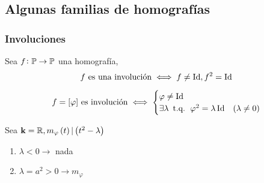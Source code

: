 \subsection{Algunas familias de homografías}

\subsubsection{Involuciones}

\begin{defi}
	Sea $f \colon \mathbb{P} \to \mathbb{P}$ una homografía,
	\[ f\text{ es una involución} \iff f \neq \operatorname{Id}, f^2 = \operatorname{Id} \]
\end{defi}
\begin{obs}
	\[
		f = [\varphi]\text{ es involución} \iff
		\begin{cases}
			\varphi \neq \operatorname{Id}  \\
			\exists\lambda\operatorname{\text{ t.q. }}\varphi^2=\lambda\operatorname{Id} & \left( \lambda \neq 0 \right)
		\end{cases}
	\]
\end{obs}
\begin{obs}
	Sea $\mathbf{k} = \mathbb{R}, m_\varphi\left( t\right) | \left( t^2-\lambda\right)$
	\begin{enumerate}[Caso 1]
		\item $\lambda<0 \rightarrow$ nada 
		\item $\lambda = a^2>0 \rightarrow m_\varphi$
	\end{enumerate}
\end{obs}

